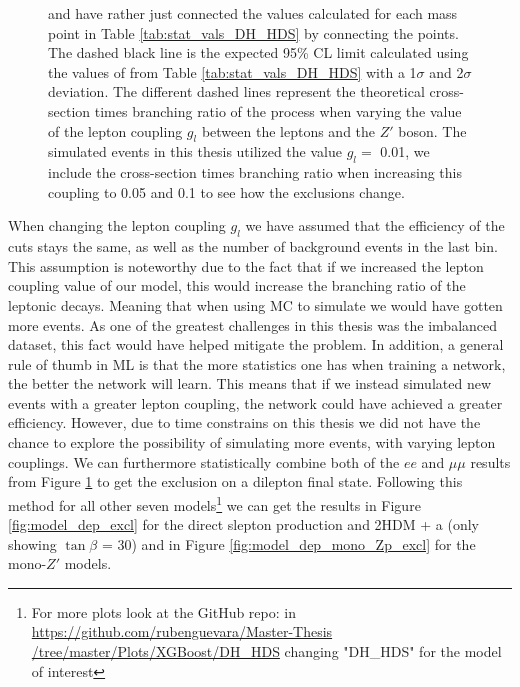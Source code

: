 \documentclass[12pt, a4paper]{book}
\begin{document}
\begin{figure}[!ht]
{   and have rather just connected the values calculated for each mass point in Table \ref{tab:stat_vals_DH_HDS} by connecting the points. The dashed black line is the expected 95\% CL limit calculated using the values of from Table \ref{tab:stat_vals_DH_HDS} with a 1$\sigma$ and 2$\sigma$ deviation. 
   The different dashed lines represent the theoretical cross-section times branching ratio of the process when varying the value of the lepton coupling $g_l$ between the leptons and the $Z'$ boson. The simulated events in this thesis utilized the value $g_l=$ 0.01, we include the cross-section times branching ratio when increasing this coupling to 0.05 and 0.1 to see how the exclusions change.  }\label{fig:DH_HDS_exclusion_ee_uu}
\end{figure}
\noindent When changing the lepton coupling $g_l$ we have assumed that the efficiency of the cuts stays the same, as well as the number of background events in the last bin. This assumption is noteworthy due to the fact that if we increased the lepton coupling value of our model, this would increase the branching ratio 
of the leptonic decays. Meaning that when using MC to simulate we would have gotten more events. As one of the greatest challenges in this thesis was the imbalanced dataset, this fact would have helped mitigate the problem. 
In addition, a general rule of thumb in ML is that the more statistics one has when training a network, the better the network will learn. 
This means that if we instead simulated new events with a greater lepton coupling, the network could have achieved a greater efficiency. However, due to time constrains on this thesis we did not have the chance to explore the possibility of simulating more events, with varying lepton couplings.
\clearpage\noindent We can furthermore statistically combine both of the $ee$ and $\mu\mu$ results from Figure \ref{fig:DH_HDS_exclusion_ee_uu} to get the exclusion on a dilepton final state. Following this method for all other seven models\footnote{For more plots look at the GitHub repo: in \href{https://github.com/rubenguevara/Master-Thesis/tree/master/Plots/XGBoost/DH_HDS}{https://github.com/rubenguevara/Master-Thesis\\/tree/master/Plots/XGBoost/DH\_HDS} changing "DH\_HDS" for the model of interest} 
we can get the results in Figure \ref{fig:model_dep_excl} for the direct slepton production and 2HDM + a (only showing $\tan\beta$ = 30) and in Figure \ref{fig:model_dep_mono_Zp_excl} for the mono-$Z'$ models.
\end{document}

